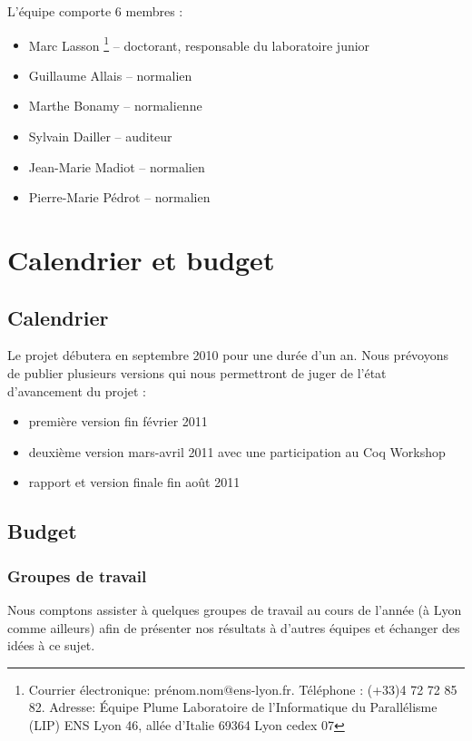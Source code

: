 \documentclass[11pt]{article}
\begin{document}
L'équipe comporte 6 membres :

\begin{itemize}
 \item Marc Lasson \footnote{Courrier électronique: prénom.nom@ens-lyon.fr.
    Téléphone : (+33)4 72 72 85 82.
    Adresse:
          Équipe Plume
          Laboratoire de l'Informatique du Parallélisme (LIP)
          ENS Lyon
          46, allée d'Italie
          69364 Lyon cedex 07
} -- doctorant, responsable du laboratoire junior
 \item Guillaume Allais -- normalien
 \item Marthe Bonamy -- normalienne
 \item Sylvain Dailler -- auditeur
 \item Jean-Marie Madiot -- normalien
 \item Pierre-Marie Pédrot -- normalien
\end{itemize}

\section{Calendrier et budget}

\subsection{Calendrier}

Le projet débutera en septembre 2010 pour une durée d'un an.
Nous prévoyons de publier plusieurs versions qui nous permettront de juger de l'état d'avancement du projet : 
\begin{itemize}
 \item première version fin février 2011
 \item deuxième version mars-avril 2011 avec une participation au Coq Workshop
 \item rapport et version finale fin août 2011
\end{itemize}

\subsection{Budget}

\subsubsection{Groupes de travail}

Nous comptons assister à quelques groupes de travail au cours de l'année (à Lyon comme ailleurs) afin de présenter nos résultats à d'autres équipes et échanger des idées à ce sujet. 
\end{document}
